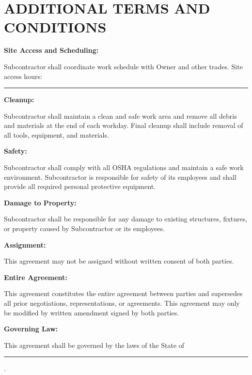 \documentclass[11pt,letterpaper]{article}
\begin{document}
\newpage

\section*{ADDITIONAL TERMS AND CONDITIONS}

\textbf{Site Access and Scheduling:}

Subcontractor shall coordinate work schedule with Owner and other trades. Site access hours: \rule{5cm}{0.4pt}

\vspace{6pt}

\textbf{Cleanup:}

Subcontractor shall maintain a clean and safe work area and remove all debris and materials at the end of each workday. Final cleanup shall include removal of all tools, equipment, and materials.

\vspace{6pt}

\textbf{Safety:}

Subcontractor shall comply with all OSHA regulations and maintain a safe work environment. Subcontractor is responsible for safety of its employees and shall provide all required personal protective equipment.

\vspace{6pt}

\textbf{Damage to Property:}

Subcontractor shall be responsible for any damage to existing structures, fixtures, or property caused by Subcontractor or its employees.

\vspace{6pt}

\textbf{Assignment:}

This agreement may not be assigned without written consent of both parties.

\vspace{6pt}

\textbf{Entire Agreement:}

This agreement constitutes the entire agreement between parties and supersedes all prior negotiations, representations, or agreements. This agreement may only be modified by written amendment signed by both parties.

\vspace{6pt}

\textbf{Governing Law:}

This agreement shall be governed by the laws of the State of \rule{5cm}{0.4pt}.
\end{document}
